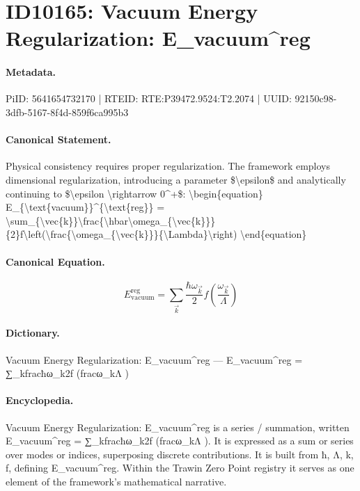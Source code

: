 \section*{ID10165: Vacuum Energy Regularization: E\_vacuum\textasciicircum{}reg}
\paragraph{Metadata.}
PiID: 5641654732170 | RTEID: RTE:P39472.9524:T2.2074 | UUID: 92150c98-3dfb-5167-8f4d-859f6ca995b3

\paragraph{Canonical Statement.}
Physical consistency requires proper regularization. The framework employs dimensional regularization, introducing a parameter \$\textbackslash{}epsilon\$ and analytically continuing to \$\textbackslash{}epsilon \textbackslash{}rightarrow 0\textasciicircum{}+\$: \textbackslash{}begin\{equation\} E\_\{\textbackslash{}text\{vacuum\}\}\textasciicircum{}\{\textbackslash{}text\{reg\}\} = \textbackslash{}sum\_\{\textbackslash{}vec\{k\}\}\textbackslash{}frac\{\textbackslash{}hbar\textbackslash{}omega\_\{\textbackslash{}vec\{k\}\}\}\{2\}f\textbackslash{}left(\textbackslash{}frac\{\textbackslash{}omega\_\{\textbackslash{}vec\{k\}\}\}\{\textbackslash{}Lambda\}\textbackslash{}right) \textbackslash{}end\{equation\}

\paragraph{Canonical Equation.}
\[
E_{\text{vacuum}}^{\text{reg}} = \sum_{\vec{k}}\frac{\hbar\omega_{\vec{k}}}{2}f\left(\frac{\omega_{\vec{k}}}{\Lambda}\right)
\]

\paragraph{Dictionary.}
Vacuum Energy Regularization: E\_vacuum\textasciicircum{}reg — E\_vacuum\textasciicircum{}reg = ∑\_kfracħω\_k2f (fracω\_kΛ )

\paragraph{Encyclopedia.}
Vacuum Energy Regularization: E\_vacuum\textasciicircum{}reg is a series / summation, written E\_vacuum\textasciicircum{}reg = ∑\_kfracħω\_k2f (fracω\_kΛ ). It is expressed as a sum or series over modes or indices, superposing discrete contributions. It is built from ħ, Λ, k, f, defining E\_vacuum\textasciicircum{}reg. Within the Trawin Zero Point registry it serves as one element of the framework's mathematical narrative.
